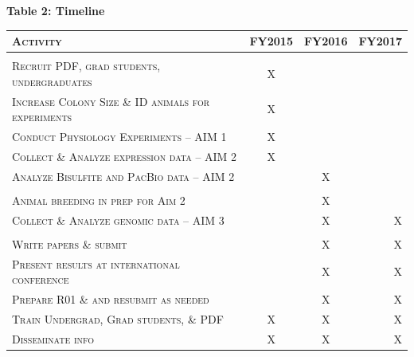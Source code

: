 \vspace{3mm}
\textbf{Table 2: Timeline}
\hypertarget{Table 2}{}
\begin{center}
\begin{tabular}{l|c c r}

\textsc{Activity} & \textsc{FY2015} & \textsc{FY2016} & \textsc{FY2017} \\
\hline \\
\textsc{Recruit PDF, grad students, undergraduates} & X & & \\
\textsc{Increase Colony Size \& ID animals for experiments } & X & & \\
\textsc{Conduct Physiology Experiments -- AIM 1} & X & & \\
\textsc{Collect \& Analyze expression data -- AIM 2} & X & & \\
\textsc{Analyze Bisulfite and PacBio data -- AIM 2} & & X & \\
\textsc{} & &  &   \\
\textsc{Animal breeding in prep for Aim 2} & & X &  \\
\textsc{Collect \& Analyze genomic data -- AIM 3} & & X & X \\
\textsc{} & &  &   \\
\textsc{Write papers \& submit} & & X & X \\
\textsc{Present results at international conference} & & X & X \\
\textsc{Prepare R01 \& and resubmit as needed} & & X & X \\
\textsc{Train Undergrad, Grad students, \& PDF} & X & X & X \\
\textsc{Disseminate info} & X & X & X \\

\end{tabular}
\end{center}
\vspace{5mm}



%
%
%
%
%
%
%
